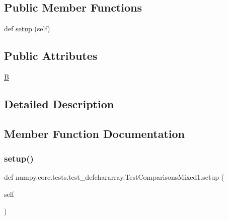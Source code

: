 \subsection*{Public Member Functions}
\begin{DoxyCompactItemize}
\item 
def \hyperlink{classnumpy_1_1core_1_1tests_1_1test__defchararray_1_1TestComparisonsMixed1_a4c7293bd5d8b69777fdcd938c22af434}{setup} (self)
\end{DoxyCompactItemize}
\subsection*{Public Attributes}
\begin{DoxyCompactItemize}
\item 
\hyperlink{classnumpy_1_1core_1_1tests_1_1test__defchararray_1_1TestComparisonsMixed1_a65222ac153f54e2c6e7abee180ee4510}{B}
\end{DoxyCompactItemize}


\subsection{Detailed Description}
 

\subsection{Member Function Documentation}
\mbox{\label{classnumpy_1_1core_1_1tests_1_1test__defchararray_1_1TestComparisonsMixed1_a4c7293bd5d8b69777fdcd938c22af434}} 
\subsubsection{\texorpdfstring{setup()}{setup()}}
{\footnotesize\ttfamily def numpy.\+core.\+tests.\+test\+\_\+defchararray.\+Test\+Comparisons\+Mixed1.\+setup (\begin{DoxyParamCaption}\item[{}]{self }\end{DoxyParamCaption})}



